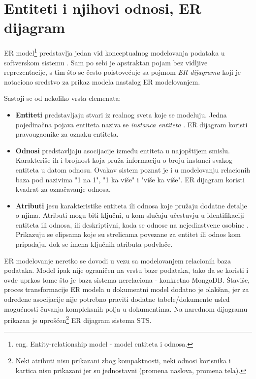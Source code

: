 \documentclass[12pt,oneside]{memoir}
\begin{document}
\section{Entiteti i njihovi odnosi, ER dijagram}

ER model\footnote{eng. Entity-relationship model - model entiteta i odnosa.} predstavlja jedan vid konceptualnog modelovanja podataka u softverskom sistemu \cite{dbmodelinganddesign}. Sam po sebi je apstraktan pojam bez vidljive reprezentacije, s tim što se često poistovećuje sa pojmom \textit{ER dijagrama} koji je notaciono sredstvo za prikaz modela nastalog ER modelovanjem.

Sastoji se od nekoliko vrsta elemenata:
\begin{itemize}
    \item \textbf{Entiteti} predstavljaju stvari iz realnog sveta koje se modeluju. Jedna pojedinačna pojava entiteta naziva se \textit{instanca entiteta} \cite{dbmodelinganddesign}. ER dijagram koristi pravougaonike za oznaku entiteta.
    \item \textbf{Odnosi} predstavljaju asocijacije između entiteta u najopštijem smislu. Karakteriše ih i brojnost koja pruža informaciju o broju instanci svakog entiteta u datom odnosu. Ovakav sistem poznat je i u modelovanju relacionih baza pod nazivima "1 na 1", "1 ka više" i "više ka više". ER dijagram koristi kvadrat za označavanje odnosa.
    \item \textbf{Atributi} jesu karakteristike entiteta ili odnosa koje pružaju dodatne detalje o njima. Atributi mogu biti ključni, u kom slučaju učestuvju u identifikaciji entiteta ili odnosa, ili deskriptivni, kada se odnose na nejedinstvene osobine \cite{dbmodelinganddesign}. Prikazuju se elipsama koje su strelicama povezane za entitet ili odnos kom pripadaju, dok se imena ključnih atributa podvlače.
\end{itemize}

ER modelovanje neretko se dovodi u vezu sa modelovanjem relacionih baza podataka. Model ipak nije ograničen na vrstu baze podataka, tako da se koristi i ovde  uprkos tome što je baza sistema nerelaciona - konkretno MongoDB. Štaviše, proces transformacije ER modela u dokumentni model dodatno je olakšan, jer za određene asocijacije nije potrebno praviti dodatne tabele/dokumente usled mogućnosti čuvanja kompleksnih polja u dokumentima. Na narednom dijagramu prikazan je uprošćen\footnote{Neki atributi nisu prikazani zbog kompaktnosti, neki odnosi korisnika i kartica nisu prikazani jer su jednostavni (promena naslova, promena tela).} ER dijagram sistema STS.
\end{document}
